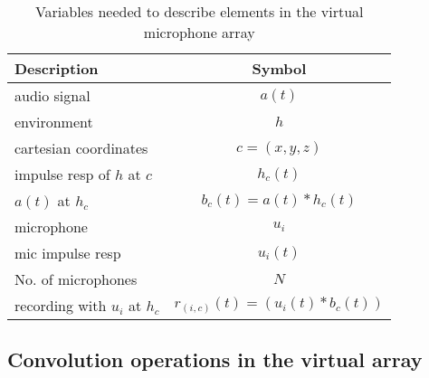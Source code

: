 \documentclass[14pt]{extarticle}
\begin{document}
\begin{table}
	\centering
	\begin{tabular}{l|c}
	
	Description & Symbol \\
	
	\hline
	audio signal & $a(t)$ \\
	
	\hline
	environment & $h$ \\
	
	\hline
	cartesian coordinates & $c=(x,y,z)$ \\
	
	\hline
	impulse resp of $h$ at $c$ & $h_c(t)$ \\
	
	\hline 
	$a(t)$ at $h_c$ & $b_c(t) = a(t) \ast h_c(t)$ \\
	
	\hline
	microphone & $u_i$ \\
	
	\hline
	mic impulse resp & $u_i(t)$ \\
	
	\hline
	No. of microphones & $N$ \\
	
	\hline
	recording with $u_i$ at $h_c$ & $r_{(i,c)}(t) = (u_i(t) \ast b_c(t))$ \\ 
	
	\end{tabular}
	
	\caption{Variables needed to describe elements in the virtual microphone array}
	\label{tab:t1}
\end{table}

\subsection{Convolution operations in the virtual array}
\end{document}
